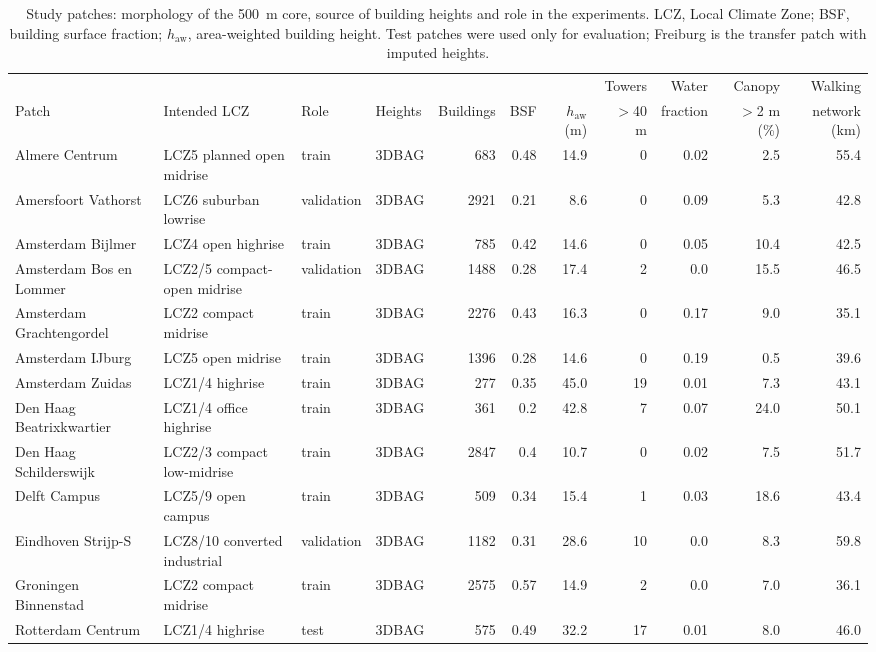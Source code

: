 \begin{table}[!h]
\centering
\footnotesize
\setlength{\tabcolsep}{3.5pt}
\caption{Study patches: morphology of the 500~m core, source of building heights and role in the experiments. LCZ, Local Climate Zone; BSF, building surface fraction; $h_\mathrm{aw}$, area-weighted building height. Test patches were used only for evaluation; Freiburg is the transfer patch with imputed heights.}
\label{tab:T1_patches}
\begin{tabular}{llllrrrrrrr}
\toprule
 & & & & & & & Towers & Water & Canopy & Walking \\
Patch & Intended LCZ & Role & Heights & Buildings & BSF & $h_\mathrm{aw}$ (m) & $>$40 m & fraction & $>$2 m (\%) & network (km) \\
\midrule
Almere Centrum & LCZ5 planned open midrise & train & 3DBAG & 683 & 0.48 & 14.9 & 0 & 0.02 & 2.5 & 55.4 \\
Amersfoort Vathorst & LCZ6 suburban lowrise & validation & 3DBAG & 2921 & 0.21 & 8.6 & 0 & 0.09 & 5.3 & 42.8 \\
Amsterdam Bijlmer & LCZ4 open highrise & train & 3DBAG & 785 & 0.42 & 14.6 & 0 & 0.05 & 10.4 & 42.5 \\
Amsterdam Bos en Lommer & LCZ2/5 compact-open midrise & validation & 3DBAG & 1488 & 0.28 & 17.4 & 2 & 0.0 & 15.5 & 46.5 \\
Amsterdam Grachtengordel & LCZ2 compact midrise & train & 3DBAG & 2276 & 0.43 & 16.3 & 0 & 0.17 & 9.0 & 35.1 \\
Amsterdam IJburg & LCZ5 open midrise & train & 3DBAG & 1396 & 0.28 & 14.6 & 0 & 0.19 & 0.5 & 39.6 \\
Amsterdam Zuidas & LCZ1/4 highrise & train & 3DBAG & 277 & 0.35 & 45.0 & 19 & 0.01 & 7.3 & 43.1 \\
Den Haag Beatrixkwartier & LCZ1/4 office highrise & train & 3DBAG & 361 & 0.2 & 42.8 & 7 & 0.07 & 24.0 & 50.1 \\
Den Haag Schilderswijk & LCZ2/3 compact low-midrise & train & 3DBAG & 2847 & 0.4 & 10.7 & 0 & 0.02 & 7.5 & 51.7 \\
Delft Campus & LCZ5/9 open campus & train & 3DBAG & 509 & 0.34 & 15.4 & 1 & 0.03 & 18.6 & 43.4 \\
Eindhoven Strijp-S & LCZ8/10 converted industrial & validation & 3DBAG & 1182 & 0.31 & 28.6 & 10 & 0.0 & 8.3 & 59.8 \\
Groningen Binnenstad & LCZ2 compact midrise & train & 3DBAG & 2575 & 0.57 & 14.9 & 2 & 0.0 & 7.0 & 36.1 \\
Rotterdam Centrum & LCZ1/4 highrise & test & 3DBAG & 575 & 0.49 & 32.2 & 17 & 0.01 & 8.0 & 46.0 \\

\end{tabular}
\end{table}
